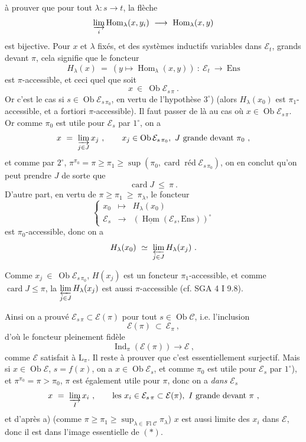\documentclass[11pt]{article}
\newcommand{\printedpage}[1]{\marginpar{\footnotesize p.~#1}}
\newcommand{\msp}[1]{\marginpar{\footnotesize [#1]}}
\newcommand{\cE}{\mathcal{E}}
\newcommand{\cC}{\mathcal{C}}
\newcommand{\Ob}{\operatorname{Ob}}
\newcommand{\Fl}{\operatorname{Fl}}
\newcommand{\Hom}{\operatorname{Hom}}
\newcommand{\Ind}{\operatorname{Ind}}
\newcommand{\Ens}{\mathrm{Ens}}
\newcommand{\card}{\operatorname{card}}
\newcommand{\red}{\operatorname{\text{réd}}}
\begin{document}
\msp{page 430}à prouver que pour tout $\lambda : s \longrightarrow t$, la flèche
\[
\varinjlim_{i} \Hom_{\lambda}(x, y_i) \ \longrightarrow \ \Hom_{\lambda}(x, y)
\]
est bijective. Pour $x$ et $\lambda$ fixés, et des systèmes inductifs variables dans $\cE_t$, grands devant $\pi$, cela signifie que le foncteur
\[
H_{\lambda}(x) \ = \ (y \longmapsto \Hom_{\lambda}(x, y)) \ : \ \cE_t \ \longrightarrow \ \Ens
\]
est $\pi$-accessible, et ceci quel que soit
\[
x \ \in \ \Ob \cE_{s\,\pi} \ .
\]
Or c'est le cas si $s \in \Ob \cE_{s\,\pi_0}$, en vertu de l'hypothèse $3^{\circ}$) (alors $H_{\lambda}(x_0)$ est $\pi_1$-accessible, %
et a fortiori $\pi$-accessible). Il faut passer de là au cas où $x \in \Ob \cE_{s\,\pi}$. Or comme $\pi_0$ est utile pour $\cE_s$ par $1^{\circ}$, on a
\[
x \ = \ \varinjlim_{j \in J} x_j \ , \qquad x_j \in \Ob \cE_{s\,\pi_0},\ J \text{ grande devant } \pi_0 \ ,
\]
et comme par $2^{\circ}$, $\pi^{\pi_0} = \pi \geqslant \pi_1 \geqslant \sup(\pi_0, \card \red \cE_{s\,\pi_0})$, on en conclut qu'on peut prendre $J$ de sorte que
\[
\card J \ \leqslant \ \pi \ .
\]
D'autre part, en vertu de $\pi \geqslant \pi_1 \ \geqslant \ \pi_{\lambda}$, le foncteur
\[
\left\{
\begin{array}{lcl}
x_0 & \longmapsto & H_{\lambda}(x_0) \\[1ex]
\cE_s & \longrightarrow & (\underline{\Hom}(\cE_s, \Ens))^{\circ}
\end{array}
\right.
\]
est $\pi_0$-accessible, donc on a
\[
H_{\lambda}(x_0) \ \simeq \ \varprojlim_{j \in J} H_{\lambda}(x_j) \ .
\]

\msp{page 431}Comme $x_j \ \in \ \Ob \cE_{s\,\pi_0}$, $H(x_j)$ est un foncteur $\pi_1$-accessible, et comme $\card J \leqslant \pi$, la $\varprojlim\limits_{j \in J} H_{\lambda}(x_j)$ est aussi $\pi$-accessible (cf. SGA 4 I 9.8).

Ainsi on a prouvé $\cE_{s\,\pi} \subset \cE(\pi)$ pour tout $s \in \Ob \cC$, i.e. l'inclusion
\[
\cE(\pi) \ \subset \ \cE_{\pi} \ ,
\]
d'où le foncteur pleinement fidèle
\[
\Ind_{\pi}(\cE(\pi)) \longrightarrow \cE \ , \tag*{$(*)$}
\]
comme $\cE$ satisfait à $\mathrm{L}_{\pi}$. Il reste à prouver que c'est essentiellement surjectif. Mais si $x \in \Ob \cE$, $s = f(x)$, on a $x \in \Ob \cE_s$, et comme $\pi_0$ est utile pour $\cE_s$ par $1^{\circ}$), et $\pi^{\pi_0} = \pi > \pi_0$,
$\pi$ est également utile pour $\pi$, donc on a \textit{dans} $\cE_s$ %
\[
x \ = \ \varinjlim_{I} x_i \ , \qquad \text{les } x_i \in \cE_{s\,\pi} \subset \cE(\pi),\ I \text{ grande devant } \pi \ ,
\]
\printedpage{165}
et d'après a) (comme $\pi \geqslant \pi_1 \geqslant \sup_{\lambda \in \Fl \cC} \pi_{\lambda}$) $x$ est aussi limite des $x_i$ dans $\cE$, donc il est dans l'image essentielle de $(*)$.
\end{document}
